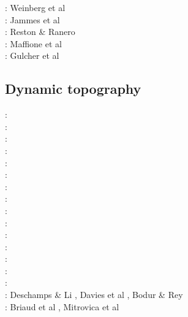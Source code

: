 \begin{scriptsize}
\twothousandseven: Weinberg et al \cite{werr07}\\
\twothousandten: Jammes et al \cite{jaml10}\\
\twothousandeleven: Reston \& Ranero \cite{rera11}\\
\twothousandfifteen: Maffione et al \cite{matv15}\\
\twothousandnineteen: Gulcher et al \cite{gubg19}
\end{scriptsize}

\subsection{Dynamic topography} 

\begin{scriptsize}
\nineteeneightyfive: \cite{hacr85}\\
\nineteeneightyseven: \cite{repa87}\\
\nineteenninetytwo: \cite{kiha92}\\
\nineteenninetythree: \cite{gurn93}\cite{gurn93b}\\
\nineteenninetynine: \cite{bumo99}\\
\twothousandthree: \cite{cogu03}\\
\twothousandnine: \cite{cohu09}\\
\twothousandten: \cite{bofb10}\cite{brau10}\cite{stfh10}\cite{shml10}\\
\twothousandeleven: \cite{rapy11}\\
\twothousandtwelve: \cite{shlm12}\cite{zhzf12}\\
\twothousandthirteen: \cite{brrs13}\cite{flgm13}\\
\twothousandfifteen: \cite{aupm15}\cite{kiff15}\cite{dali15}\\
\twothousandsixteen: \cite{howa16}\cite{gvfb16}\cite{yagu16}\cite{stei16}\cite{cogb16}\\
\twothousandseventeen: \cite{yamm17}\cite{aumh17}\cite{grrb17}\\
\twothousandeighteen: \cite{osss18}\cite{vibc18}\\
\twothousandnineteen: Deschamps \& Li \cite{deli19}, Davies et al \cite{davk19}, Bodur \& Rey \cite{bore19}\\
\twothousandtwenty: Briaud et al \cite{braf20}, Mitrovica et al \cite{miac20}
\end{scriptsize}


